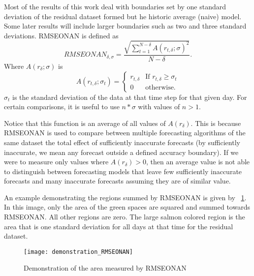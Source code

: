 Most of the results of this work deal with boundaries set by one standard deviation of the residual dataset formed but he historic average (naive) model.  Some later results will include larger boundaries such as two and three standard deviations.  RMSEONAN is defined as
\begin{equation}
RMSEONAN_{\delta, \sigma} = \frac{\sqrt{\sum_{t = 1}^{N - \delta}{A(r_{t, \delta}; \sigma)^{2}}}} {N - \delta}.
\end{equation}
Where $A(r_{\delta}; \sigma)$ is 
\begin{equation}
A(r_{t, \delta}; \sigma_{t}) = \begin{cases}
			r_{t, \delta}    &    \text{If }r_{t, \delta} \ge \sigma_{t} \\
			0                     &    \text{otherwise.}
			\end{cases}
\end{equation}
$\sigma_{t}$ is the standard deviation of the data at that time step for that given day.  For certain comparisons, it is useful to use $n*\sigma$ with values of $n > 1$.  

Notice that this function is an average of all values of $A(r_{\delta})$.  This is because RMSEONAN is used to compare between multiple forecasting algorithms of the same dataset the total effect of sufficiently inaccurate forecasts (by sufficiently inaccurate, we mean any forecast outside a defined  accuracy boundary).  If we were to measure only values where $A(r_{\delta}) > 0$, then an average value is not able to distinguish between forecasting models that leave few sufficiently inaccurate forecasts and many inaccurate forecasts assuming they are of similar value.  

An example demonstrating the regions summed by RMSEONAN is given by ~\ref{fig:dem_RMSEONAN}.  In this image, only the area of the green spaces are squared and summed towards RMSEONAN.  All other regions are zero.  The large salmon colored region is the area that is one standard deviation for all days at that time for the residual dataset.

\begin{figure}[h]
	\begin{center}
		\texttt{[image: demonstration\_RMSEONAN]}
	\end{center}
	\caption{Demonstration of the area measured by RMSEONAN}
	\label{fig:dem_RMSEONAN}
\end{figure}


